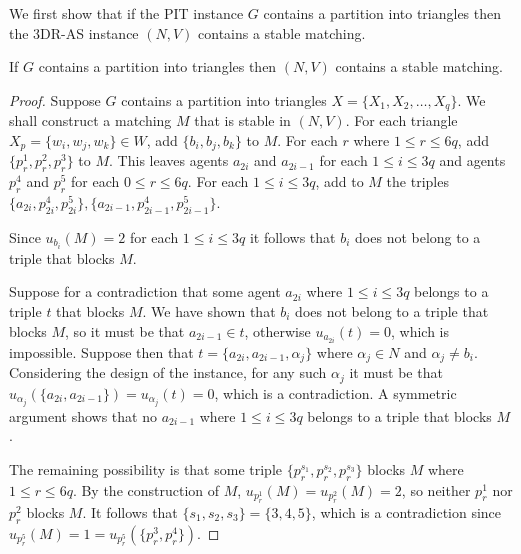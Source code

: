 
We first show that if the PIT instance $G$ contains a partition into triangles then the 3DR-AS instance $(N, V)$ contains a stable matching.

\begin{lem}
\label{lem:threed_sr_as_binary_reduction_firstdirection}
If $G$ contains a partition into triangles then $(N, V)$ contains a stable matching.
\end{lem}
\begin{proof}
Suppose $G$ contains a partition into triangles $X = \{ X_1, X_2, \dots, X_q \}$. We shall construct a matching $M$ that is stable in $(N, V)$. For each triangle $X_p=\{ w_i, w_j, w_k \}\in W$, add $\{b_i, b_j, b_k\}$ to $M$. For each $r$ where $1 \leq r \leq 6q$, add $\{ p_r^1, p_r^2, p_r^3 \}$ to $M$. This leaves agents $a_{2i}$ and $a_{2i-1}$ for each $1 \leq i \leq 3q$ and agents $p_r^4$ and $p_r^5$ for each $0 \leq r \leq 6q$. For each $1 \leq i \leq 3q$, add to $M$ the triples $\{a_{2i}, p_{2i}^4, p_{2i}^5\}, \{a_{2i-1}, p_{2i-1}^4, p_{2i-1}^5\}$. 

Since $u_{b_i}(M)=2$ for each $1\leq i\leq 3q$ it follows that $b_i$ does not belong to a triple that blocks $M$.

Suppose for a contradiction that some agent $a_{2i}$ where $1\leq i\leq 3q$ belongs to a triple $t$ that blocks $M$. We have shown that $b_i$ does not belong to a triple that blocks $M$, so it must be that $a_{2i-1}\in t$, otherwise $u_{a_{2i}}(t)=0$, which is impossible. Suppose then that $t=\{ a_{2i}, a_{2i-1}, \alpha_j \}$ where $\alpha_j \in N$ and $\alpha_j \neq b_i$. Considering the design of the instance, for any such $\alpha_j$ it must be that $u_{\alpha_j}(\{ a_{2i}, a_{2i-1} \})=u_{\alpha_j}(t)=0$, which is a contradiction. A symmetric argument shows that no $a_{2i-1}$ where $1\leq i \leq 3q$ belongs to a triple that blocks $M$.

The remaining possibility is that some triple $\{ p_r^{s_1}, p_r^{s_2}, p_r^{s_3} \}$ blocks $M$ where $1\leq r \leq 6q$. By the construction of $M$, $u_{p_r^1}(M) = u_{p_r^2}(M) = 2$, so neither $p_r^1$ nor $p_r^2$ blocks $M$. It follows that $\{ s_1, s_2, s_3 \} = \{ 3, 4, 5 \}$, which is a contradiction since $u_{p_r^5}(M) = 1 = u_{p_r^5}(\{ p_r^3, p_r^4 \})$.
\end{proof}


